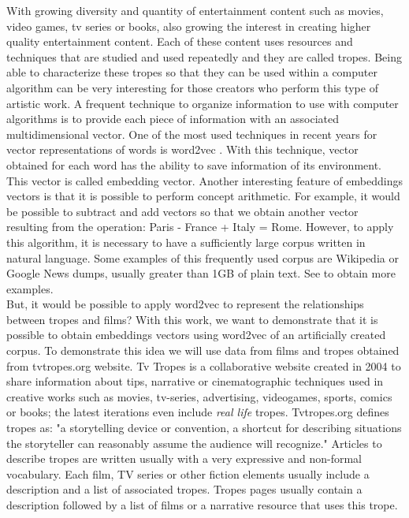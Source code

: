 \documentclass[letterpaper]{article}
\begin{document}
   With growing diversity and quantity of entertainment content such as movies, video games, tv series or books, also growing the interest in creating higher quality entertainment content.
   Each of these content uses resources and techniques that are studied and used repeatedly and they are called tropes. Being able to characterize these tropes so that they can be used within a computer algorithm can be very interesting for those creators who perform this type of artistic work. A frequent technique to organize information to use with computer algorithms is to provide each piece of information with an associated multidimensional vector. One of the most used techniques in recent years for vector representations of words is word2vec \cite{mikolov2013}.
   With this technique, vector obtained for each word has the ability to save information of its environment. This vector is called embedding vector.  %
   Another interesting feature of embeddings vectors is that it is possible to perform concept arithmetic. For example, it would be possible to subtract and add vectors so that we obtain another vector resulting from the operation: Paris - France + Italy = Rome. However, to apply this algorithm, it is necessary to have a sufficiently large corpus written in natural language. Some examples of this frequently used corpus are Wikipedia or Google News dumps, usually greater than 1GB of plain text. See \cite{google-word2vec} to obtain more examples. \\
   
   But, it would be possible to apply word2vec to represent the relationships between tropes and films? With this work, we want to demonstrate that it is possible to obtain embeddings vectors using word2vec of an artificially created corpus. To demonstrate this idea we will use data from films and tropes obtained from tvtropes.org website. Tv Tropes is a collaborative website created in 2004 to share information about tips, narrative or cinematographic techniques
   used in creative works such as movies, tv-series, advertising,
   videogames, sports, comics or books; the latest iterations even include
   {\em real life} tropes. Tvtropes.org defines tropes as:
   "a storytelling device or convention, a shortcut for describing
   situations the storyteller can reasonably assume the audience will
   recognize." Articles to describe tropes are written usually with a very
   expressive and non-formal vocabulary. 
   Each film, TV series or other fiction elements usually include a description and a list of associated tropes. Tropes pages usually contain a description followed by a list
   of films or a narrative resource that uses this trope.
    
\end{document}

